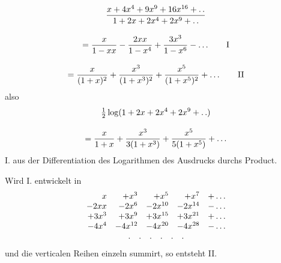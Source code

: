 \[
\begin{gathered}
\frac{x+4x^4+9x^9+16x^{16}+\mathinner{.\,.}}{1+2x+2x^4+2x^9+\mathinner{.\,.}}
\\[9pt]=\frac{x}{1-xx}-\frac{2xx}{1-x^4}+\frac{3x^3}{1-x^6}-\mathinner{.\,.\,.}
\qquad \mathrm{I}\\[9pt]=\frac{x}{(1+x)^2}+\frac{x^3}{(1+x^3)^2}+\frac{x^5}{(1+x^5)^2}+\mathinner{.\,.\,.}
\qquad \mathrm{II}
\end{gathered}
\]
also
\[
\begin{gathered}\tfrac12\log(1+2x+2x^4+2x^9+\mathinner{.\,.})\\[9pt]=\frac{x}{1+x}+\frac{x^3}{3(1+x^3)}+\frac{x^5}{5(1+x^5)}+\mathinner{.\,.\,.}\end{gathered}
\]
I. aus der Differentiation des Logarithmen des Ausdrucks durchs Product.

Wird I. entwickelt in
\[
\begin{array}{rrrrl}
x&+x^3&+x^5&+x^7&+\mathinner{.\,.\,.}\\
-2xx&-2x^6&-2x^{10}&-2x^{14}&-\mathinner{.\,.\,.}\\
+3x^3&+3x^9&+3x^{15}&+3x^{21}&+\mathinner{.\,.\,.}\\
-4x^4&-4x^{12}&-4x^{20}&-4x^{28}&-\mathinner{.\,.\,.}\\
\multicolumn{5}{c}{.\quad .\quad .\quad .\quad .\quad .}
\end{array}
\]
und die verticalen Reihen einzeln summirt, so entsteht II.

